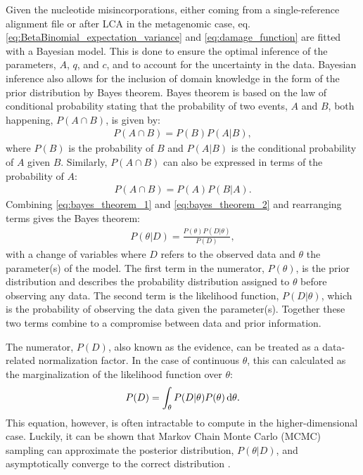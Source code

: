 Given the nucleotide misincorporations, either coming from a single-reference alignment file or after LCA in the metagenomic case, eq. \eqref{eq:BetaBinomial_expectation_variance} and \eqref{eq:damage_function} are fitted with a Bayesian model. This is done to ensure the optimal inference of the parameters, $A$, $q$, and $c$, and to account for the uncertainty in the data. Bayesian inference also allows for the inclusion of domain knowledge in the form of the prior distribution by Bayes theorem. Bayes theorem is based on the law of conditional probability \autocite{barlowStatisticsGuideUse1993} stating that the probability of two events, $A$ and $B$, both happening, $P(A \cap B)$, is given by:
\begin{align}
    P(A \cap B) = P(B)P(A|B),
    \label{eq:bayes_theorem_1}
\end{align}
where $P(B)$ is the probability of $B$ and $P(A|B)$ is the conditional probability of $A$ given $B$. Similarly, $P(A \cap B)$ can also be expressed in terms of the probability of $A$:
\begin{align}
    P(A \cap B) = P(A)P(B|A).
    \label{eq:bayes_theorem_2}
\end{align}
Combining \autoref{eq:bayes_theorem_1} and \autoref{eq:bayes_theorem_2} and rearranging terms gives the Bayes theorem:
\begin{align}
    P(\theta|D) = \frac{P(\theta)P(D|\theta)}{P(D)},
    \label{eq:bayes_theorem}
\end{align}
with a change of variables where $D$ refers to the observed data and $\theta$ the parameter(s) of the model. The first term in the numerator, $P(\theta)$, is the prior distribution and describes the probability distribution assigned to $\theta$ before observing any data. The second term is the likelihood function, $P(D|\theta)$, which is the probability of observing the data given the parameter(s). Together these two terms combine to a compromise between data and prior information.

The numerator, $P(D)$, also known as the evidence, can be treated as a data-related normalization factor. In the case of continuous $\theta$, this can calculated as the marginalization of the likelihood function over $\theta$:
\begin{align}
    P(D) = \int_\theta P(D|\theta)P(\theta) \mathop{}\!\mathrm{d} \theta.
    \label{eq:evidence}
\end{align}
This equation, however, is often intractable to compute in the higher-dimensional case. Luckily, it can be shown that Markov Chain Monte Carlo (MCMC) sampling can approximate the posterior distribution, $P(\theta|D)$, and asymptotically converge to the correct distribution \autocite{gelmanBayesianDataAnalysis2015a}.

